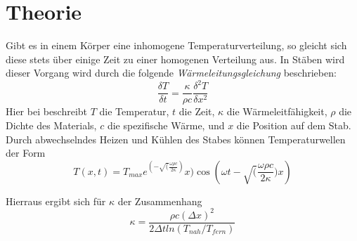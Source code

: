 \section{Theorie}
\label{sec:Theorie}
Gibt es in einem Körper eine inhomogene Temperaturverteilung, so gleicht sich diese stets über einige Zeit zu einer homogenen Verteilung aus. In Stäben wird dieser Vorgang wird durch die folgende \textit{Wärmeleitungsgleichung} beschrieben:
\begin{equation}
  \frac{\delta T}{\delta t} = \frac{\kappa}{\rho c} \frac{\delta^2 T}{\delta x^2}
  \label{eqn:T}
\end{equation}
Hier bei beschreibt $T$ die Temperatur, $t$ die Zeit, $\kappa$ die Wärmeleitfähigkeit, $\rho$ die Dichte des Materials, $c$ die spezifische Wärme, und $x$ die Position auf dem Stab.
Durch abwechselndes Heizen und Kühlen des Stabes können Temperaturwellen der Form
\begin{equation}
  T(x,t) = T_{max} e^(-\sqrt(\frac{\omega \rho c}{2\kappa})x) \cos\left(\omega t - \sqrt(\frac{\omega \rho c}{2 \kappa})x \right)
  \label{eqn:Welle}
\end{equation}

Hierraus ergibt sich für $\kappa$ der Zusammenhang
\begin{equation}
  \kappa = \frac{\rho c (\Delta x)^2}{2 \Delta t ln(T_{nah}/T_{fern})}
  \label{eqn:kappa}
\end{equation}
